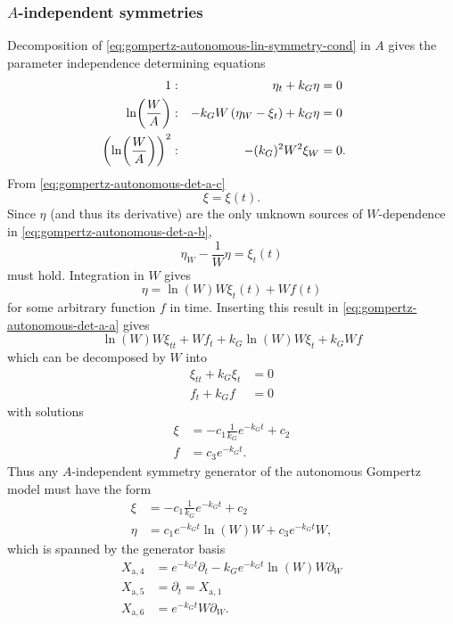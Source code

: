 \subsubsection{\texorpdfstring{\(A\)-independent symmetries}{Carrying capacity-independent symmetries}}

Decomposition of \cref{eq:gompertz-autonomous-lin-symmetry-cond} in \(A\) gives the parameter independence determining equations
\begin{subequations}
  \begin{flalign}
    1 & : & \eta_t + k_G \eta &= 0 && \FlLabel{eq:gompertz-autonomous-det-a-a}\\
    \ln(\frac{W}{A}) & : & - k_G W\left(\eta_W - \xi_t\right)  + k_G \eta &= 0 && \FlLabel{eq:gompertz-autonomous-det-a-b}\\
    \left(\ln(\frac{W}{A})\right)^2 & : & - (k_G)^2 W^2 \xi_W &= 0. && \FlLabel{eq:gompertz-autonomous-det-a-c}
  \end{flalign}
\end{subequations}
From \cref{eq:gompertz-autonomous-det-a-c}
\begin{equation}
  \xi = \xi(t).
\end{equation}
Since \(\eta\) (and thus its derivative) are the only unknown sources of \(W\)-dependence in \cref{eq:gompertz-autonomous-det-a-b},
\begin{equation}
  \eta_W - \frac{1}{W}\eta = \xi_t(t)
\end{equation}
must hold.
Integration in \(W\) gives
\begin{equation}
  \eta = \ln(W) W \xi_t(t) + W f(t)
\end{equation}
for some arbitrary function \(f\) in time.
Inserting this result in \cref{eq:gompertz-autonomous-det-a-a} gives
\begin{equation}
  \ln(W) W \xi_{tt} + W f_t + k_G \ln(W) W \xi_t + k_G W f
\end{equation}
which can be decomposed by \(W\) into
\begin{align}
  \xi_{tt} + k_G \xi_t &= 0 \\
  f_t + k_G f &= 0
\end{align}
with solutions
\begin{align}
  \xi &= - c_1 \frac{1}{k_G} e^{-k_G t} + c_2 \\
  f &= c_3 e^{-k_G t}.
\end{align}
Thus any \(A\)-independent symmetry generator of the autonomous Gompertz model  must have the form
\begin{align}
  \xi &= - c_1 \frac{1}{k_G} e^{-k_G t} + c_2 \\
  \eta &= c_1 e^{-k_G t} \ln(W) W  + c_3 e^{-k_G t} W,
\end{align}
which is spanned by the generator basis
\begin{align}
  X_{\text{a},4} &= e^{-k_G t} \partial_t - k_G e^{-k_G t} \ln(W) W \partial_W\\
  X_{\text{a},5} &= \partial_t = X_{\text{a},1}\\
  X_{\text{a},6} &= e^{-k_G t} W \partial_W.
\end{align}

